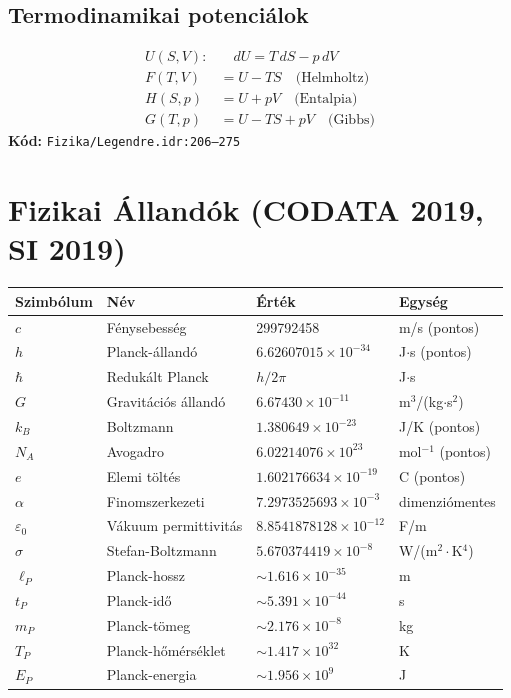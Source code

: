 \documentclass[12pt,a4paper]{article}
\begin{document}
\subsection{Termodinamikai potenciálok}
\begin{align*}
U(S,V): & \quad dU = T\,dS - p\,dV \\
F(T,V) &= U - TS \quad \text{(Helmholtz)} \\
H(S,p) &= U + pV \quad \text{(Entalpia)} \\
G(T,p) &= U - TS + pV \quad \text{(Gibbs)}
\end{align*}
\textbf{Kód:} \texttt{Fizika/Legendre.idr:206--275}

\section{Fizikai Állandók (CODATA 2019, SI 2019)}

\begin{longtable}{lll l}
\toprule
Szimbólum & Név & Érték & Egység \\
\midrule
$c$ & Fénysebesség & 299792458 & m/s (pontos) \\
$h$ & Planck-állandó & $6.62607015 \times 10^{-34}$ & J$\cdot$s (pontos) \\
$\hbar$ & Redukált Planck & $h/2\pi$ & J$\cdot$s \\
$G$ & Gravitációs állandó & $6.67430 \times 10^{-11}$ & m$^3$/(kg$\cdot$s$^2$) \\
$k_B$ & Boltzmann & $1.380649 \times 10^{-23}$ & J/K (pontos) \\
$N_A$ & Avogadro & $6.02214076 \times 10^{23}$ & mol$^{-1}$ (pontos) \\
$e$ & Elemi töltés & $1.602176634 \times 10^{-19}$ & C (pontos) \\
$\alpha$ & Finomszerkezeti & $7.2973525693 \times 10^{-3}$ & dimenziómentes \\
$\varepsilon_0$ & Vákuum permittivitás & $8.8541878128 \times 10^{-12}$ & F/m \\
$\sigma$ & Stefan-Boltzmann & $5.670374419 \times 10^{-8}$ & W/(m$^2\cdot$K$^4$) \\
\midrule
$\ell_P$ & Planck-hossz & $\sim 1.616 \times 10^{-35}$ & m \\
$t_P$ & Planck-idő & $\sim 5.391 \times 10^{-44}$ & s \\
$m_P$ & Planck-tömeg & $\sim 2.176 \times 10^{-8}$ & kg \\
$T_P$ & Planck-hőmérséklet & $\sim 1.417 \times 10^{32}$ & K \\
$E_P$ & Planck-energia & $\sim 1.956 \times 10^{9}$ & J \\
\bottomrule
\end{longtable}
\end{document}
